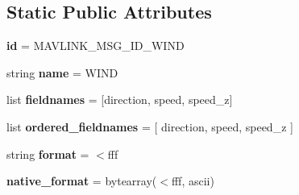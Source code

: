 \subsection*{Static Public Attributes}
\begin{DoxyCompactItemize}
\item 
\mbox{\label{classpymavlink_1_1dialects_1_1v10_1_1MAVLink__wind__message_a2381dec0972fde0fb16e99f01fded0da}} 
{\bfseries id} = M\+A\+V\+L\+I\+N\+K\+\_\+\+M\+S\+G\+\_\+\+I\+D\+\_\+\+W\+I\+ND
\item 
\mbox{\label{classpymavlink_1_1dialects_1_1v10_1_1MAVLink__wind__message_a11b62e3c24de0c3ec12e7dbbb71d9355}} 
string {\bfseries name} = \textquotesingle{}W\+I\+ND\textquotesingle{}
\item 
\mbox{\label{classpymavlink_1_1dialects_1_1v10_1_1MAVLink__wind__message_a4b5a583c257de51103eb362f555851f6}} 
list {\bfseries fieldnames} = \mbox{[}\textquotesingle{}direction\textquotesingle{}, \textquotesingle{}speed\textquotesingle{}, \textquotesingle{}speed\+\_\+z\textquotesingle{}\mbox{]}
\item 
\mbox{\label{classpymavlink_1_1dialects_1_1v10_1_1MAVLink__wind__message_a65ebb392237f32a3edfb69d6179a90b9}} 
list {\bfseries ordered\+\_\+fieldnames} = \mbox{[} \textquotesingle{}direction\textquotesingle{}, \textquotesingle{}speed\textquotesingle{}, \textquotesingle{}speed\+\_\+z\textquotesingle{} \mbox{]}
\item 
\mbox{\label{classpymavlink_1_1dialects_1_1v10_1_1MAVLink__wind__message_a5db85bb7b2b2a729c10119b85435286f}} 
string {\bfseries format} = \textquotesingle{}$<$fff\textquotesingle{}
\item 
\mbox{\label{classpymavlink_1_1dialects_1_1v10_1_1MAVLink__wind__message_ad8df01b8e4970ccf403596935dfe8890}} 
{\bfseries native\+\_\+format} = bytearray(\textquotesingle{}$<$fff\textquotesingle{}, \textquotesingle{}ascii\textquotesingle{})
\item 

\end{DoxyCompactItemize}
